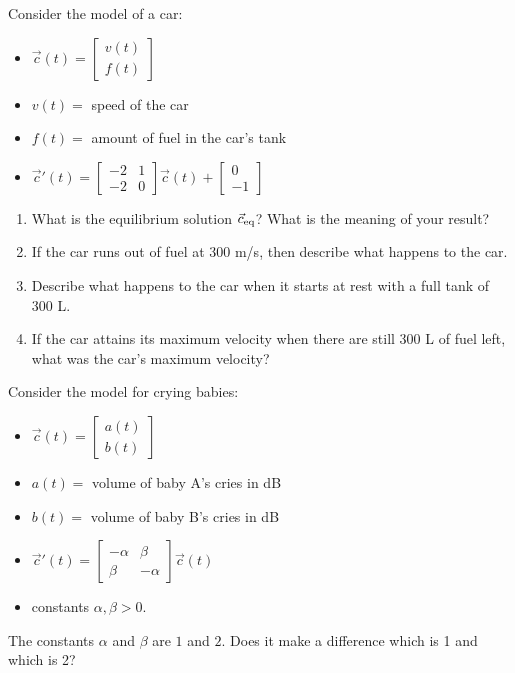 \begin{exercises}
\begin{problist}
	
	\prob Consider the model of a car:
	\begin{itemize}
		\item $\vec{c}(t) = \begin{bmatrix} v(t) \\ f(t) \end{bmatrix}$
		\item $v(t)=$ speed of the car
		\item $f(t)=$ amount of fuel in the car's tank
		\item $\vec{c}'(t) =
		\begin{bmatrix}
			-2 & 1 \\
			-2 & 0 
		\end{bmatrix}
		\vec{c}(t)
		+ \begin{bmatrix}
 			0 \\ -1	
		\end{bmatrix}$
	\end{itemize}
	\begin{enumerate}
		\item What is the equilibrium solution $\vec{c}_{\rm eq}$? What is the meaning of your result?
		\item If the car runs out of fuel at 300 m/s, then describe what happens to the car. 
		\item Describe what happens to the car when it starts at rest with a full tank of $300$ L.
		\item If the car attains its maximum velocity when there are still $300$ L of fuel left, what was the car's maximum velocity?


	\end{enumerate}


	\prob Consider the model for crying babies:
	\begin{itemize}
		\item $\vec{c}(t) = \begin{bmatrix} a(t) \\ b(t) \end{bmatrix}$
		\item $a(t)=$ volume of baby A's cries in dB
		\item $b(t)=$ volume of baby B's cries in dB
		\item $\vec{c}'(t) =
		\begin{bmatrix}
			-\alpha & \beta \\
			\beta & -\alpha 
		\end{bmatrix}
		\vec{c}(t)$
		\item constants $\alpha,\beta>0$.
	\end{itemize}

	The constants $\alpha$ and $\beta$ are $1$ and $2$. Does it make a difference which is 1 and which is 2?


	
		
	\end{problist}
\end{exercises}